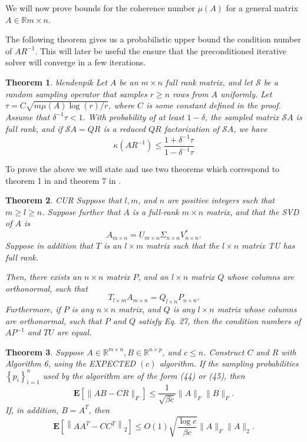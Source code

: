 \documentclass{article}
\newtheorem{theorem}{Theorem}
\begin{document}
We will now prove bounds for the coherence number $\mu(A)$ for a general matrix $A \in \mathbb{R}{m \times n}$.

\bigskip


The following theorem gives us a probabilistic upper bound the condition number of $AR^{-1}$.
This will later be useful the ensure that the preconditioned iterative solver
will converge in a few iterations.

\begin{theorem}{blendenpik}
Let $A$ be an $m \times n$ full rank matrix, and let $\mathcal{S}$ be a random
sampling operator that samples $r \geq n$ rows from $A$ uniformly. Let $\tau=C
\sqrt{m \mu(A) \log (r) / r}$, where $C$ is some constant defined in the proof.
Assume that $\delta^{-1} \tau<1$. With probability of at least $1-\delta$, the
sampled matrix $\mathcal{S} A$ is full rank, and if $\mathcal{S} A=Q R$ is a
reduced $Q R$ factorization of $\mathcal{S} A$, we have
$$
\kappa\left(A R^{-1}\right) \leq \frac{1+\delta^{-1} \tau}{1-\delta^{-1} \tau}
$$
\end{theorem}

To prove the above we will state and use two theorems which correspond to theorem 1 in \cite{CUR} and theorem 7 in \cite{randalg}. 

\begin{theorem}{CUR}
Suppose that $l, m$, and $n$ are positive integers such that $m \geq l \geq n$. Suppose further that $A$ is a full-rank $m \times n$ matrix, and that the SVD of $A$ is
$$
A_{m \times n}=U_{m \times n} \Sigma_{n \times n} V_{n \times n}^{*} .
$$
Suppose in addition that $T$ is an $l \times m$ matrix such that the $l \times n$ matrix TU has full rank.

Then, there exists an $n \times n$ matrix $P$, and an $l \times n$ matrix $Q$ whose columns are orthonormal, such that
$$
T_{l \times m} A_{m \times n}=Q_{l \times n} P_{n \times n} .
$$
Furthermore, if $P$ is any $n \times n$ matrix, and $Q$ is any $l \times n$ matrix whose columns are orthonormal, such that $P$ and $Q$ satisfy Eq. 27, then the condition numbers of $A P^{-1}$ and $T U$ are equal.
\end{theorem}

\begin{theorem}
 Suppose $A \in \mathbb{R}^{m \times n}, B \in \mathbb{R}^{n \times p}$, and $c \leq n$. Construct $C$ and $R$ with Algorithm 6, using the EXPECTED $(c)$ algorithm. If the sampling probabilities $\left\{p_{i}\right\}_{i=1}^{n}$ used by the algorithm are of the form (44) or (45), then
$$
\mathbf{E}\left[\|A B-C R\|_{F}\right] \leq \frac{1}{\sqrt{\beta c}}\|A\|_{F}\|B\|_{F} .
$$
If, in addition, $B=A^{T}$, then
$$
\mathbf{E}\left[\left\|A A^{T}-C C^{T}\right\|_{2}\right] \leq O(1) \sqrt{\frac{\log c}{\beta c}}\|A\|_{F}\|A\|_{2} .
$$
\end{theorem}
\end{document}
